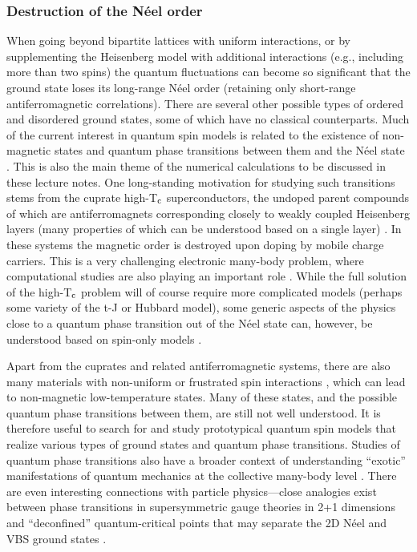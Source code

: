 \documentclass[draft,numberedheadings]{aipproc}
\begin{document}
\subsubsection{Destruction of the N\'eel order}

When going beyond bipartite lattices with uniform interactions, or by supplementing the Heisenberg model with additional interactions (e.g., including 
more than two spins) the quantum fluctuations can become so significant that the ground state loses its long-range N\'eel order (retaining only short-range 
antiferromagnetic correlations). There are several other possible types of ordered and disordered ground states, some of which have no classical counterparts. 
Much of the current interest in quantum spin models is related to the existence of non-magnetic states and quantum phase transitions between them and the N\'eel state 
\cite{sachdev1}. This is also the main theme of the numerical calculations to be discussed in these lecture notes. One long-standing motivation for studying 
such transitions stems from the cuprate high-T$_{\rm c}$ superconductors, the undoped parent compounds of which are antiferromagnets corresponding closely 
to weakly coupled Heisenberg layers (many properties of which can be understood based on a single layer) \cite{manousakis}. In these systems the magnetic 
order is destroyed upon doping by mobile charge carriers. This is a very challenging electronic many-body problem, where computational studies are also  
playing an important role \cite{dagotto2,aimi,white2}. While the full solution of the high-T$_{\rm c}$ problem will of course require more complicated models 
(perhaps some variety of the t-J or Hubbard model), some generic aspects of the physics close to a quantum phase transition out of the N\'eel state can, however, 
be understood based on spin-only models \cite{sachdev4}. 

Apart from the cuprates and related antiferromagnetic systems, there are also many materials with non-uniform or frustrated 
spin interactions \cite{schollwock1,diep,gardner}, which can lead to non-magnetic low-temperature states. Many of these states, and the possible quantum phase 
transitions between them, are still not well understood. It is therefore useful to search for and study prototypical quantum spin models that realize various 
types of ground states and quantum phase transitions. Studies of quantum phase transitions also have a broader context of understanding ``exotic'' manifestations of 
quantum mechanics at the collective many-body level \cite{sachdev1}. There are even interesting connections with particle physics---close analogies exist 
between phase transitions in supersymmetric gauge theories in 2+1 dimensions and ``deconfined'' quantum-critical points that may separate the 2D N\'eel and 
VBS ground states \cite{sachdev3}.
\end{document}
